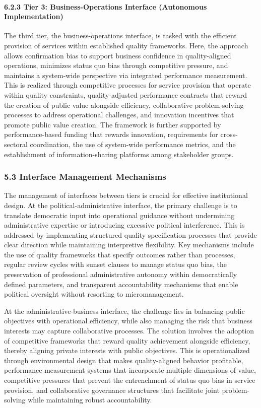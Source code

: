 \paragraph{6.2.3 Tier 3: Business-Operations Interface (Autonomous
Implementation)}\label{tier-3-business-operations-interface-autonomous-implementation}

The third tier, the business-operations interface, is tasked with the
efficient provision of services within established quality frameworks.
Here, the approach allows confirmation bias to support business
confidence in quality-aligned operations, minimizes status quo bias
through competitive pressure, and maintains a system-wide perspective
via integrated performance measurement. This is realized through
competitive processes for service provision that operate within quality
constraints, quality-adjusted performance contracts that reward the
creation of public value alongside efficiency, collaborative
problem-solving processes to address operational challenges, and
innovation incentives that promote public value creation. The framework
is further supported by performance-based funding that rewards
innovation, requirements for cross-sectoral coordination, the use of
system-wide performance metrics, and the establishment of
information-sharing platforms among stakeholder groups.

\subsubsection{5.3 Interface Management
Mechanisms}\label{interface-management-mechanisms}

The management of interfaces between tiers is crucial for effective
institutional design. At the political-administrative interface, the
primary challenge is to translate democratic input into operational
guidance without undermining administrative expertise or introducing
excessive political interference. This is addressed by implementing
structured quality specification processes that provide clear direction
while maintaining interpretive flexibility. Key mechanisms include the
use of quality frameworks that specify outcomes rather than processes,
regular review cycles with sunset clauses to manage status quo bias, the
preservation of professional administrative autonomy within
democratically defined parameters, and transparent accountability
mechanisms that enable political oversight without resorting to
micromanagement.

At the administrative-business interface, the challenge lies in
balancing public objectives with operational efficiency, while also
managing the risk that business interests may capture collaborative
processes. The solution involves the adoption of competitive frameworks
that reward quality achievement alongside efficiency, thereby aligning
private interests with public objectives. This is operationalized
through environmental design that makes quality-aligned behavior
profitable, performance measurement systems that incorporate multiple
dimensions of value, competitive pressures that prevent the entrenchment
of status quo bias in service provision, and collaborative governance
structures that facilitate joint problem-solving while maintaining
robust accountability.

